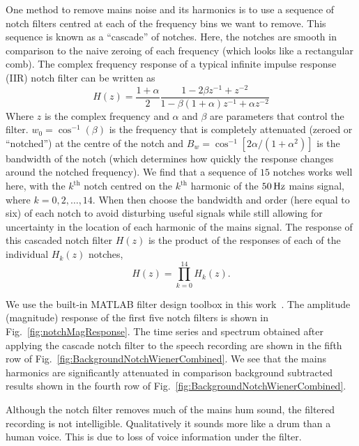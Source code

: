 \documentclass[paper-main.tex]{subfiles}
\begin{document}
One method to remove mains noise and its harmonics is to use a sequence of notch filters centred at each of the frequency bins we want to remove. This sequence is known as a ``cascade'' of notches. Here, the notches are smooth in comparison to the naive zeroing of each frequency (which looks like a rectangular comb). The complex frequency response of a typical infinite impulse response (IIR) notch filter can be written as \citep{10.5555/541204}
\begin{equation}
    \label{eqn:notch}
    H(z)=\frac{1+\alpha}{2}\frac{1-2\beta z^{-1}+z^{-2}}{1-\beta(1+\alpha)z^{-1}+\alpha z^{-2}}
\end{equation}
Where $z$ is the complex frequency and $\alpha$ and $\beta$ are parameters that control the filter. $w_0=\cos^{-1}(\beta)$ is the frequency that is completely attenuated (zeroed or ``notched'') at the centre of the notch and $B_w=\cos^{-1}[2\alpha/(1+\alpha^2)]$ is the bandwidth of the notch (which determines how quickly the response changes around the notched frequency).
We find that a sequence of $15$ notches works well here, with the $k^\mathrm{th}$ notch centred on the $k^\mathrm{th}$ harmonic of the $50\,{\rm Hz}$ mains signal, where $k=0,2,\dots,14$. When then choose the bandwidth and order (here equal to six) of each notch to avoid disturbing useful signals while still allowing for uncertainty in the location of each harmonic of the mains signal. The response of this cascaded notch filter $H(z)$ is the product of the responses of each of the individual $H_k(z)$ notches,
\begin{equation}
    \label{eqn:notch15}
    H(z) = \prod_{k=0}^{14} H_k(z).
\end{equation}

We use the built-in MATLAB filter design toolbox in this work~\cite{MATLAB}. 
The amplitude (magnitude) response of the first five notch filters is shown in Fig.~\ref{fig:notchMagResponse}. 
The time series and spectrum obtained after applying the cascade notch filter to the speech recording are shown in the fifth row of Fig.~\ref{fig:BackgroundNotchWienerCombined}.
We see that the mains harmonics are significantly attenuated in comparison background subtracted results shown in the fourth row of Fig.~\ref{fig:BackgroundNotchWienerCombined}.

Although the notch filter removes much of the mains hum sound, the filtered recording is not intelligible. Qualitatively it sounds more like a drum than a human voice. This is due to loss of voice information under the filter.
\end{document}
